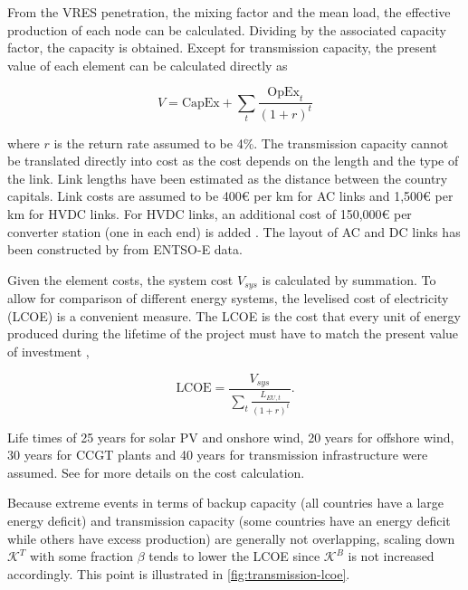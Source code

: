 \documentclass[a4paper, 5p, sort&compress]{elsarticle}%
\newcommand{\paren}[1]{\left(#1\right)}
\begin{document}
From the VRES penetration, the mixing factor and the mean load, the
effective production of each node can be calculated. Dividing by the
associated capacity factor, the capacity is obtained. Except for
transmission capacity, the present value of each element can be
calculated directly as

\begin{equation}
  \label{eq:6}
  V = \text{CapEx} + \sum_{t} \frac{\text{OpEx}_{t}}{\paren{1 + r}^{t}}
\end{equation}

where $r$ is the return rate assumed to be 4\%. The transmission
capacity cannot be translated directly into cost as the cost depends
on the length and the type of the link. Link lengths have been
estimated as the distance between the country capitals. Link costs are
assumed to be 400\euro{}
per km for AC links and 1,500\euro{}
per km for HVDC links. For HVDC links, an additional cost of
150,000\euro{}
per converter station (one in each end) is
added \cite{McKinsey, Schaber, Schaber2}. The layout of AC and
DC links has been constructed by \cite{rolando2014} from ENTSO-E data.


Given the element costs, the system cost $V_{sys}$ is calculated by
summation. To allow for comparison of different energy systems, the
levelised cost of electricity (LCOE) is a convenient measure. The LCOE
is the cost that every unit of energy produced during the lifetime of
the project must have to match the present value of
investment \cite{Short1995},

\begin{equation}
  \label{eq:7}
  \text{LCOE} = \frac{V_{sys}}{\sum_{t} \frac{L_{EU,
        t}}{\paren{1+r}^{t}}} .
\end{equation}

Life times of 25 years for solar PV and onshore wind, 20 years for
offshore wind, 30 years for CCGT plants and 40 years for transmission
infrastructure were assumed. See \cite{Sensitivity} for more details
on the cost calculation.

Because extreme events in terms of backup capacity (all countries have
a large energy deficit) and transmission capacity (some countries have
an energy deficit while others have excess production) are generally
not overlapping, scaling down $\mathcal{K}^{T}$ with some fraction
$\beta$ tends to lower the LCOE since $\mathcal{K}^{B}$ is not increased
accordingly. This point is illustrated in
\cref{fig:transmission-lcoe}.
\end{document}
